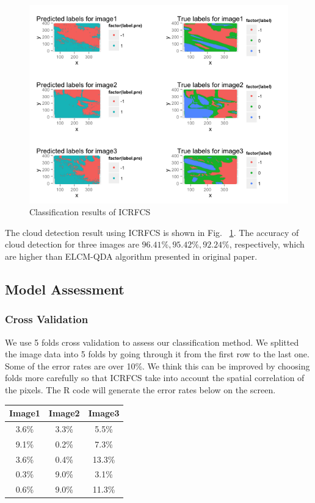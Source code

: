 \documentclass[english]{article}\usepackage{graphicx, color}
\numberwithin{equation}{section}
\numberwithin{figure}{section}
\begin{document}
\begin{figure}[!h]
  \begin{center}
    \includegraphics[width=\columnwidth]{figures/CRF.png}
  \end{center}
  \caption{Classification results of ICRFCS}
  \label{fig:ICRFCS}
\end{figure}

The cloud detection result using ICRFCS is shown in Fig. ~\ref{fig:ICRFCS}. The 
accuracy of cloud detection for three images are $96.41\%, 95.42\%, 92.24\%$, 
respectively, which are higher than ELCM-QDA algorithm presented in original 
paper.

\subsection{Model Assessment}
\subsubsection{Cross Validation}
We use 5 folds cross validation to assess our classification method. We splitted the image data into 5 folds by going through it from the first row to the last one. Some of the error rates are over 10\%. We think this can be improved by choosing folds more carefully so that ICRFCS take into account the spatial correlation of the pixels. The R code will generate the error rates below on the screen.

\begin{center}
 \begin{tabular}{||c c c||} 
 \hline
 Image1 & Image2 & Image3 \\ [0.5ex] 
 \hline\hline
 3.6\% & 3.3\% & 5.5\% \\ 
 \hline
 9.1\% & 0.2\% & 7.3\% \\
 \hline
 3.6\% & 0.4\% & 13.3\% \\
 \hline
 0.3\% & 9.0\% & 3.1\% \\
 \hline
 0.6\% & 9.0\% & 11.3\% \\ [1ex] 
 \hline
\end{tabular}
\end{center}
\end{document}
